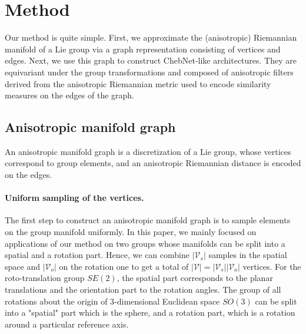 \documentclass{article}
\newcommand{\haguettaz}[1]{{\color[rgb]{.8,.3,.2}{#1}}}
\begin{document}
\haguettaz{More recently, DeepSphere for equivariance in a graph NN setting. Graph NN approach exploiting equivariance with Victor Garcia Satorras.}

\section{Method} \label{sec:method}

Our method is quite simple. First, we approximate the (anisotropic) Riemannian manifold of a Lie group via a graph representation consisting of vertices and edges. Next, we use this graph to construct ChebNet-like architectures. They are equivariant under the group transformations and composed of anisotropic filters derived from the anisotropic Riemannian metric used to encode similarity measures on the edges of the graph.

\subsection{Anisotropic manifold graph} \label{sec:anisotropic_manifold_graph}

An anisotropic manifold graph is a discretization of a Lie group, whose vertices correspond to group elements, and an anisotropic Riemannian distance is encoded on the edges. 

\paragraph{Uniform sampling of the vertices.} The first step to construct an anisotropic manifold graph is to sample elements on the group manifold uniformly. In this paper, we mainly focused on applications of our method on two groups whose manifolds can be split into a spatial and a rotation part. Hence, we can combine $|\mathcal{V}_s|$ samples in the spatial space and $|\mathcal{V}_o|$ on the rotation one to get a total of $|\mathcal{V}| = |\mathcal{V}_s| |\mathcal{V}_o|$ vertices. For the roto-translation group  $SE(2)$, the spatial part corresponds to the planar translations and the orientation part to the rotation angles. The group of all rotations about the origin of 3-dimensional Euclidean space $SO(3)$ can be split into a "spatial" part which is the sphere, and a rotation part, which is a rotation around a particular reference axis. 
\end{document}
